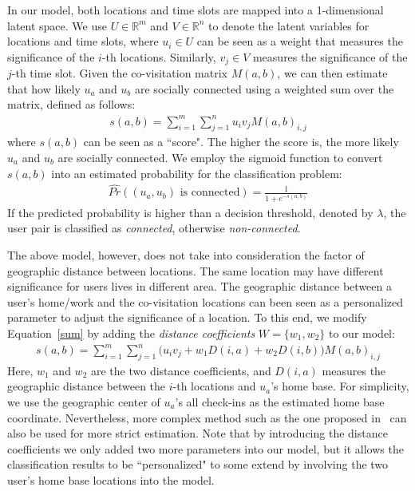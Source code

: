 In our model, both locations and time slots are mapped into a 1-dimensional latent space. We use $U \in \mathbb{R}^m$ and $V \in \mathbb{R}^n$ to denote the latent variables for locations and time slots, where $u_i \in U$ can be seen as a weight that measures the significance of the $i$-th locations. Similarly, $v_j \in V$ measures the significance of the $j$-th time slot. Given the co-visitation matrix $M(a,b)$, we can then estimate that how likely $u_a$ and $u_b$ are socially connected using a weighted sum over the matrix, defined as follows:
\begin{align}\label{sum}
s(a,b) = \sum_{i = 1} ^m \sum_{j=1}^n u_i v_j M(a,b)_{i,j}
\end{align}
where $s(a,b)$ can be seen as a ``score". The higher the score is, the more likely $u_a$ and $u_b$ are socially connected. We employ the sigmoid function to convert $s(a,b)$ into an estimated probability for the classification problem:
\begin{align}\label{sigmoid}
\hat{Pr}( (u_a, u_b)  \text{ is connected} ) = \frac{1}{1 + e^{-s(a,b)}}
\end{align}
If the predicted probability is higher than a decision threshold, denoted by $\lambda$, the user pair is classified as \textit{connected}, otherwise \textit{non-connected}.

The above model, however, does not take into consideration the factor of geographic distance between locations. The same location may have different significance for users lives in different area. The geographic distance between a user's home/work and the co-visitation locations can been seen as a personalized parameter to adjust the significance of a location. To this end, we modify Equation~\ref{sum} by adding the \textit{distance coefficients} $W = \{w_1, w_2\}$ to our model:
\begin{align}\label{sum2}
s(a,b) = \sum_{i = 1} ^m \sum_{j=1}^n \bigg( u_i v_j + w_1 D(i,a) + w_2 D(i,b) \bigg) M(a,b)_{i,j} 
\end{align}
Here, $w_1$ and $w_2$ are the two distance coefficients, and $D(i,a)$ measures the geographic distance between the $i$-th locations and $u_a$'s home base. For simplicity, we use the geographic center of $u_a$'s all check-ins as the estimated home base coordinate. Nevertheless, more complex method such as the one proposed in~\cite{cho2011friendship} can also be used for more strict estimation. Note that by introducing the distance coefficients we only added two more parameters into our model, but it allows the classification results to be ``personalized" to some extend by involving the two user's home base locations into the model.


